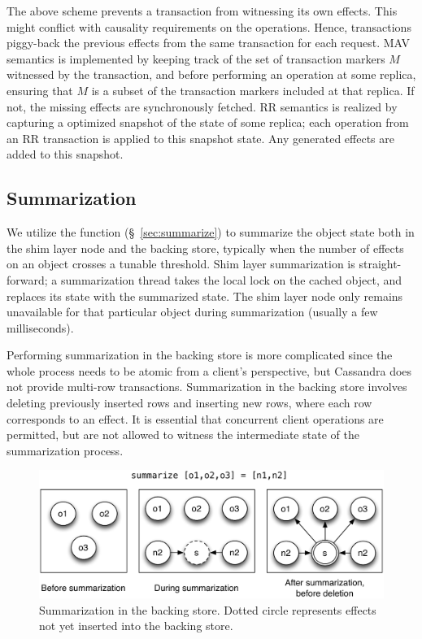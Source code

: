 The above scheme prevents a transaction from witnessing its own effects. This
might conflict with causality requirements on the operations. Hence,
transactions piggy-back the previous effects from the same transaction for each
request. MAV semantics is implemented by keeping track of the set of
transaction markers $M$ witnessed by the transaction, and before performing an
operation at some replica, ensuring that $M$ is a subset of the transaction
markers included at that replica. If not, the missing effects are synchronously
fetched. RR semantics is realized by capturing a optimized snapshot of the
state of some replica; each operation from an RR transaction is applied to this
snapshot state. Any generated effects are added to this snapshot.

\subsection{Summarization}

We utilize the  function (\S~\ref{sec:summarize}) to summarize
the object state both in the shim layer node and the backing store, typically
when the number of effects on an object crosses a tunable threshold.
Shim layer summarization is straight-forward; a summarization thread takes the
local lock on the cached object, and replaces its state with the summarized
state. The shim layer node only remains unavailable for that particular object
during summarization (usually a few milliseconds).

Performing summarization in the backing store is more complicated since the
whole process needs to be atomic from a client's perspective, but Cassandra
does not provide multi-row transactions. Summarization in the backing store
involves deleting previously inserted rows and inserting new rows, where each
row corresponds to an effect. It is essential that concurrent client operations
are permitted, but are not allowed to witness the intermediate state of the
summarization process.

\begin{figure}
\begin{center}
\includegraphics[width=\columnwidth]{Figures/SumDisk}
\end{center}
\caption{Summarization in the backing store. Dotted circle represents effects
not yet inserted into the backing store.}
\label{fig:impl_sum_disk}
\end{figure}

